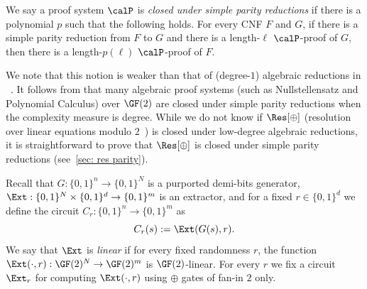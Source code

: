 We say a proof system $\calP$ is \emph{closed under simple parity reductions} if there is a polynomial $p$ such that the following holds. For every CNF $F$ and $G$, if there is a simple parity reduction from $F$ to $G$ and there is a length-$\ell$ $\calP$-proof of $G$, then there is a length-$p(\ell)$ $\calP$-proof of $F$.

We note that this notion is weaker than that of (degree-$1$) algebraic reductions in ~\cite{BussGIP01, DBLP:conf/stoc/RezendeGNPR021}. It follows from \cite[Lemma 8.3]{DBLP:conf/stoc/RezendeGNPR021} that many algebraic proof systems (such as Nullstellensatz and Polynomial Calculus) over $\GF(2)$ are closed under simple parity reductions when the complexity measure is degree. While we do not know if $\Res[\oplus]$ (resolution over linear equations modulo $2$~\cite{ItsyksonS20}) is closed under low-degree algebraic reductions, it is straightforward to prove that $\Res[\oplus]$ is closed under simple parity reductions (see~\autoref{sec: res parity}).



Recall that $G:\{0, 1\}^n \to \{0, 1\}^N$ is a purported demi-bits generator, $\Ext: \{0, 1\}^N\times \{0, 1\}^d \to \{0, 1\}^m$ is an extractor, and for a fixed $r\in\{0, 1\}^d$ we define the circuit $C_r: \{0, 1\}^n \to \{0, 1\}^m$ as
\[C_r(s) := \Ext(G(s), r).\]
We say that $\Ext$ is \emph{linear} if for every fixed randomness $r$, the function $\Ext(\cdot, r): \GF(2)^N \to \GF(2)^m$ is $\GF(2)$-linear. For every $r$ we fix a circuit $\Ext_r$ for computing $\Ext(\cdot, r)$ using $\oplus$ gates of fan-in $2$ only.

